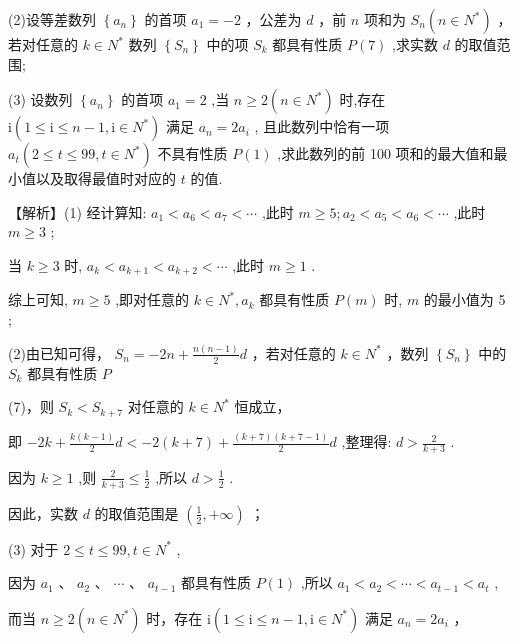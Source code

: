\documentclass[10pt]{article}
\begin{document}
(2)设等差数列 \(\left\{  {a}_{n}\right\}\) 的首项 \({a}_{1} =  - 2\) ，公差为 \(d\) ，前 \(n\) 项和为 \({S}_{n}\left( {n \in  {N}^{ * }}\right)\) ，若对任意的 \(k \in  {N}^{ * }\) 数列 \(\left\{  {S}_{n}\right\}\) 中的项 \({S}_{k}\) 都具有性质 \(P\left( 7\right)\) ,求实数 \(d\) 的取值范围;

(3) 设数列 \(\left\{  {a}_{n}\right\}\) 的首项 \({a}_{1} = 2\) ,当 \(n \geq  2\left( {n \in  {N}^{ * }}\right)\) 时,存在 \(\mathrm{i}\left( {1 \leq  \mathrm{i} \leq  n - 1,\mathrm{i} \in  {N}^{ * }}\right)\) 满足 \({a}_{n} = 2{a}_{i}\) , 且此数列中恰有一项 \({a}_{t}\left( {2 \leq  t \leq  {99},t \in  {N}^{ * }}\right)\) 不具有性质 \(P\left( 1\right)\) ,求此数列的前 100 项和的最大值和最小值以及取得最值时对应的 \(t\) 的值.

【解析】(1) 经计算知: \({a}_{1} < {a}_{6} < {a}_{7} < \cdots\) ,此时 \(m \geq  5;{a}_{2} < {a}_{5} < {a}_{6} < \cdots\) ,此时 \(m \geq  3\) ;

当 \(k \geq  3\) 时, \({a}_{k} < {a}_{k + 1} < {a}_{k + 2} < \cdots\) ,此时 \(m \geq  1\) .

综上可知, \(m \geq  5\) ,即对任意的 \(k \in  {N}^{ * },{a}_{k}\) 都具有性质 \(P\left( m\right)\) 时, \(m\) 的最小值为 5 ;

(2)由已知可得， \({S}_{n} =  - {2n} + \frac{n\left( {n - 1}\right) }{2}d\) ，若对任意的 \(k \in  {N}^{ * }\) ，数列 \(\left\{  {S}_{n}\right\}\) 中的 \({S}_{k}\) 都具有性质 \(P\)

(7)，则 \({S}_{k} < {S}_{k + 7}\) 对任意的 \(k \in  {N}^{ * }\) 恒成立，

即 \(- {2k} + \frac{k\left( {k - 1}\right) }{2}d <  - 2\left( {k + 7}\right)  + \frac{\left( {k + 7}\right) \left( {k + 7 - 1}\right) }{2}d\) ,整理得: \(d > \frac{2}{k + 3}\) .

因为 \(k \geq  1\) ,则 \(\frac{2}{k + 3} \leq  \frac{1}{2}\) ,所以 \(d > \frac{1}{2}\) .

因此，实数 \(d\) 的取值范围是 \(\left( {\frac{1}{2}, + \infty }\right)\) ；

(3) 对于 \(2 \leq  t \leq  {99},t \in  {N}^{ * }\) ,

因为 \({a}_{1}\text{ 、 }{a}_{2}\text{ 、 }\cdots \text{ 、 }{a}_{t - 1}\) 都具有性质 \(P\left( 1\right)\) ,所以 \({a}_{1} < {a}_{2} < \cdots  < {a}_{t - 1} < {a}_{t}\) ,

而当 \(n \geq  2\left( {n \in  {N}^{ * }}\right)\) 时，存在 \(\mathrm{i}\left( {1 \leq  \mathrm{i} \leq  n - 1,\mathrm{i} \in  {N}^{ * }}\right)\) 满足 \({a}_{n} = 2{a}_{i}\) ，
\end{document}
